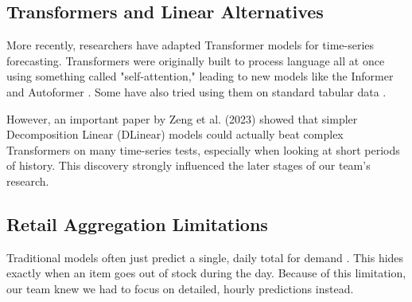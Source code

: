\subsection{Transformers and Linear Alternatives}
More recently, researchers have adapted Transformer models for time-series forecasting. Transformers were originally built to process language all at once using something called "self-attention," leading to new models like the Informer \cite{zhou2021informer} and Autoformer \cite{wu2021autoformer}. Some have also tried using them on standard tabular data \cite{gorishniy2021revisiting}. 

However, an important paper by Zeng et al. (2023) \cite{zeng2023dlinear} showed that simpler Decomposition Linear (DLinear) models could actually beat complex Transformers on many time-series tests, especially when looking at short periods of history. This discovery strongly influenced the later stages of our team's research.

\subsection{Retail Aggregation Limitations}
Traditional models often just predict a single, daily total for demand \cite{syntetos2016}. This hides exactly when an item goes out of stock during the day. Because of this limitation, our team knew we had to focus on detailed, hourly predictions instead.
